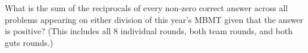 What is the sum of the reciprocals of every non-zero correct answer across all problems appearing on either division of this year's MBMT given that the answer is positive? (This includes all $8$ individual rounds, both team rounds, and both guts rounds.)
